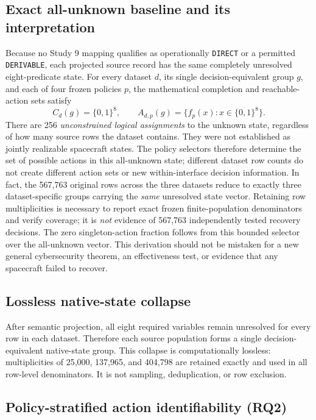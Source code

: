 \documentclass[preprint,12pt]{elsarticle}
\begin{document}
\subsection{Exact all-unknown baseline and its interpretation}
Because no Study 9 mapping qualifies as operationally \texttt{DIRECT} or a permitted \texttt{DERIVABLE}, each projected source record has the same completely unresolved eight-predicate state. For every dataset $d$, its single decision-equivalent group $g$, and each of four frozen policies $p$, the mathematical completion and reachable-action sets satisfy
\begin{equation}
\label{eq:allunknown}
C_d(g)=\{0,1\}^{8},
\qquad
A_{d,p}(g)=\{f_p(x):x\in\{0,1\}^{8}\}.
\end{equation}
There are 256 \emph{unconstrained logical assignments} to the unknown state, regardless of how many source rows the dataset contains. They were not established as jointly realizable spacecraft states. The policy selectors therefore determine the set of possible actions in this all-unknown state; different dataset row counts do not create different action sets or new within-interface decision information. In fact, the 567,763 original rows across the three datasets reduce to exactly three dataset-specific groups carrying the \emph{same} unresolved state vector. Retaining row multiplicities is necessary to report exact frozen finite-population denominators and verify coverage; it is \emph{not} evidence of 567,763 independently tested recovery decisions. The zero singleton-action fraction follows from this bounded selector over the all-unknown vector. This derivation should not be mistaken for a new general cybersecurity theorem, an effectiveness test, or evidence that any spacecraft failed to recover.

\subsection{Lossless native-state collapse}

After semantic projection, all eight required variables remain unresolved for every row in each dataset. Therefore each source population forms a single decision-equivalent native-state group. This collapse is computationally lossless: multiplicities of 25,000, 137,965, and 404,798 are retained exactly and used in all row-level denominators. It is not sampling, deduplication, or row exclusion.

\subsection{Policy-stratified action identifiability (RQ2)}
\end{document}
